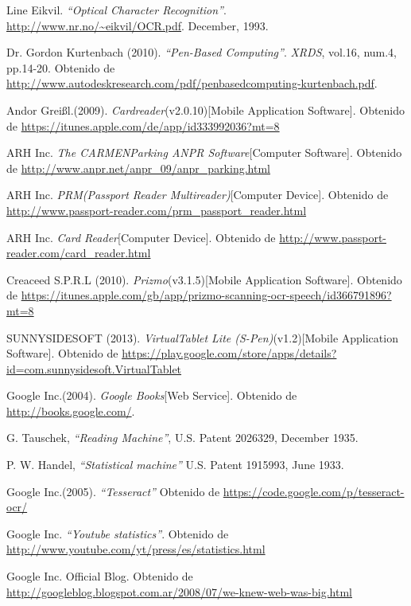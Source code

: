 \begin{thebibliography}{100}
		Line Eikvil.
		\emph{``Optical Character Recognition''}.
		\url{http://www.nr.no/~eikvil/OCR.pdf}.
		December, 1993.
		
		Dr. Gordon Kurtenbach (2010).
		\emph{``Pen-Based Computing''}.
		\emph{XRDS}, vol.16, num.4, pp.14-20.
		Obtenido de \url{http://www.autodeskresearch.com/pdf/penbasedcomputing-kurtenbach.pdf}.
		
		Andor Grei{\ss}l.(2009).
		\emph{Cardreader}(v2.0.10)[Mobile Application Software].
		Obtenido de \url{https://itunes.apple.com/de/app/id333992036?mt=8}
		
		ARH Inc.
		\emph{The CARMEN\textregistered Parking ANPR Software}[Computer Software].
		Obtenido de \url{http://www.anpr.net/anpr_09/anpr_parking.html}
		
		ARH Inc.
		\emph{PRM(Passport Reader Multireader)}[Computer Device].
		Obtenido de \url{http://www.passport-reader.com/prm_passport_reader.html}
		
		ARH Inc.
		\emph{Card Reader}[Computer Device].
		Obtenido de \url{http://www.passport-reader.com/card_reader.html}
	
		Creaceed S.P.R.L (2010).
		\emph{Prizmo}(v3.1.5)[Mobile Application Software].
		Obtenido de \url{https://itunes.apple.com/gb/app/prizmo-scanning-ocr-speech/id366791896?mt=8}
		
		SUNNYSIDESOFT (2013).
		\emph{VirtualTablet Lite (S-Pen)}(v1.2)[Mobile Application Software].
		Obtenido de \url{https://play.google.com/store/apps/details?id=com.sunnysidesoft.VirtualTablet}
		
		Google Inc.(2004).
		\emph{Google Books}[Web Service].
		Obtenido de \url{http://books.google.com/}.
		
		G. Tauschek,
		\emph{``Reading Machine''},
		U.S. Patent 2026329,
		December 1935.
		
		P. W. Handel,
		\emph{``Statistical machine''}
		U.S. Patent 1915993,
		June 1933.
	
		Google Inc.(2005).
		\emph{``Tesseract''}
		Obtenido de \url{https://code.google.com/p/tesseract-ocr/}
		
	Google Inc.
	\emph{``Youtube statistics''}.
	Obtenido de \url{http://www.youtube.com/yt/press/es/statistics.html}
	
	Google Inc. 
	Official Blog.
	Obtenido de \url{http://googleblog.blogspot.com.ar/2008/07/we-knew-web-was-big.html}
	

\end{thebibliography}
